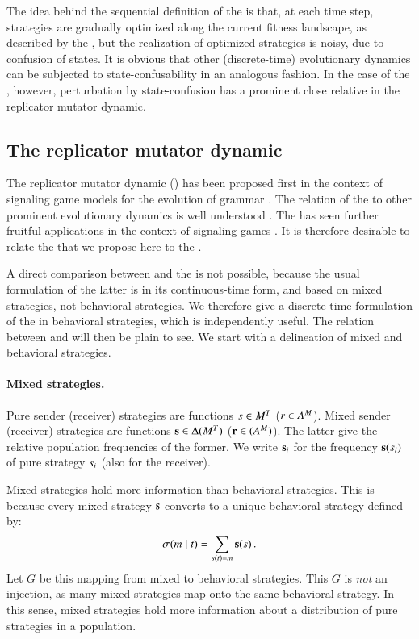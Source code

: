 The idea behind the sequential definition of the \rdd is that, at each
time step, strategies are gradually optimized along the current
fitness landscape, as described by the \rd, but the realization of
optimized strategies is noisy, due to confusion of states. It is
obvious that other (discrete-time) evolutionary dynamics can be
subjected to state-confusability in an analogous fashion. In the case
of the \rd, however, perturbation by state-confusion has a prominent
close relative in the replicator mutator dynamic.

\subsection{The replicator mutator dynamic}

The replicator mutator dynamic (\rmd) has been proposed first in the
context of signaling game models for the evolution of grammar
\citep[e.g.][]{KomarovaNiyogi2001:The-Evolutionar,NowakKomarova2001:Evolution-of-Un,Nowak2006:Evolutionary-Dy}. The
relation of the \rmd to other prominent evolutionary dynamics is well
understood \citep{PageNowak2002:Unifying-Evolut}. The \rmd has seen
further fruitful applications in the context of signaling games
\citep[e.g.][]{HutteggerSkyrms2010:Evolutionary-Dy,Deo2014:The-Semantic-an}. It
is therefore desirable to relate the \rdd that we propose here to the
\rmd.

A direct comparison between \rdd and the \rmd is not possible, because
the usual formulation of the latter is in its continuous-time form,
and based on mixed strategies, not behavioral strategies. We therefore
give a discrete-time formulation of the \rmd in behavioral strategies,
which is independently useful. The relation between \rdd and \rmd will
then be plain to see. We start with a delineation of mixed and
behavioral strategies.

\paragraph{Mixed strategies.} Pure sender (receiver) strategies are
functions $s \in M^T$ ($r \in
A^M$). Mixed sender (receiver) strategies are functions
$\mathrm{\mathbf{s}} \in \Delta(M^T)$ ($\mathrm{\mathbf{r}} \in
(A^M)$). The latter give the relative population frequencies
of the former. We write $\mathrm{\mathbf{s}}_i$ for the frequency
$\mathrm{\mathbf{s}}(s_i)$ of pure strategy $s_i$ (also for the
receiver). 

Mixed strategies hold more information than behavioral
strategies. This is because every mixed strategy $\mathrm{\mathbf{s}}$ converts to
a unique behavioral strategy defined by:
\begin{align*}
  \sigma(m \mid t) = \sum_{s(t) = m} \mathrm{\mathbf{s}}(s)\,.
\end{align*} 
Let $G$ be this mapping from mixed to behavioral strategies. This $G$
is \emph{not} an injection, as many mixed strategies map onto the same
behavioral strategy. In this sense, mixed strategies hold more
information about a distribution of pure strategies in a population.

